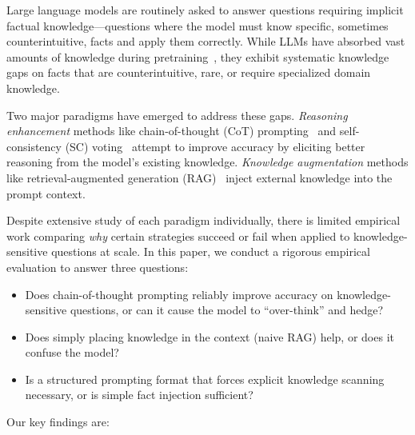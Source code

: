 Large language models are routinely asked to answer questions requiring implicit factual knowledge---questions where the model must know specific, sometimes counterintuitive, facts and apply them correctly. While LLMs have absorbed vast amounts of knowledge during pretraining~\cite{touvron2023llama,dubey2024llama3}, they exhibit systematic knowledge gaps on facts that are counterintuitive, rare, or require specialized domain knowledge.

Two major paradigms have emerged to address these gaps. \emph{Reasoning enhancement} methods like chain-of-thought (CoT) prompting~\cite{wei2022cot} and self-consistency (SC) voting~\cite{wang2022selfconsistency} attempt to improve accuracy by eliciting better reasoning from the model's existing knowledge. \emph{Knowledge augmentation} methods like retrieval-augmented generation (RAG)~\cite{lewis2020rag} inject external knowledge into the prompt context.

Despite extensive study of each paradigm individually, there is limited empirical work comparing \emph{why} certain strategies succeed or fail when applied to knowledge-sensitive questions at scale. In this paper, we conduct a rigorous empirical evaluation to answer three questions:

\begin{itemize}
\item Does chain-of-thought prompting reliably improve accuracy on knowledge-sensitive questions, or can it cause the model to ``over-think'' and hedge?
\item Does simply placing knowledge in the context (naive RAG) help, or does it confuse the model?
\item Is a structured prompting format that forces explicit knowledge scanning necessary, or is simple fact injection sufficient?
\end{itemize}

Our key findings are:

